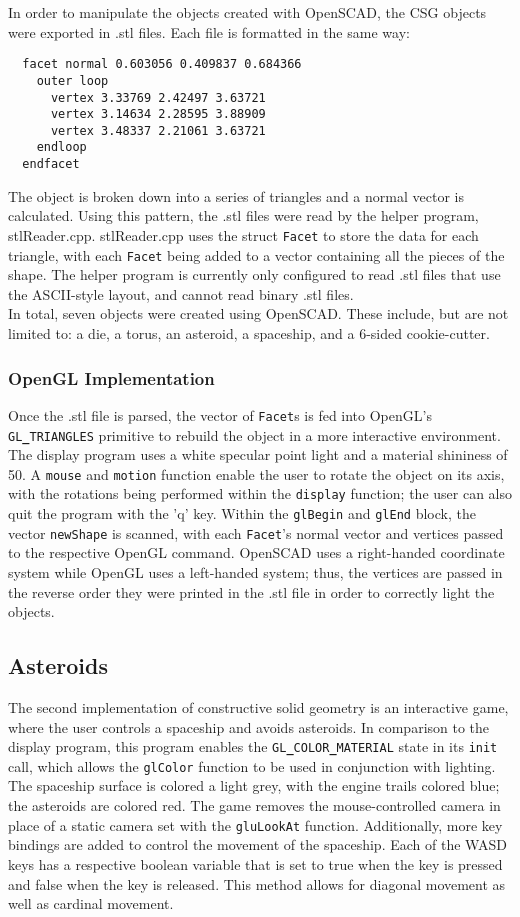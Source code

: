 \documentclass[12pt]{article}
\begin{document}
\begin{doublespace}
In order to manipulate the objects created with OpenSCAD, the CSG objects were exported in .stl files. Each file is formatted in the same way:
\begin{lstlisting}
  facet normal 0.603056 0.409837 0.684366
    outer loop
      vertex 3.33769 2.42497 3.63721
      vertex 3.14634 2.28595 3.88909
      vertex 3.48337 2.21061 3.63721
    endloop
  endfacet
\end{lstlisting}
The object is broken down into a series of triangles and a normal vector is calculated. Using this pattern, the .stl files were read by the helper program, stlReader.cpp. stlReader.cpp uses the struct \texttt{Facet} to store the data for each triangle, with each \texttt{Facet} being added to a vector containing all the pieces of the shape. The helper program is currently only configured to read .stl files that use the ASCII-style layout, and cannot read binary .stl files.\\

In total, seven objects were created using OpenSCAD. These include, but are not limited to: a die, a torus, an asteroid, a spaceship, and a 6-sided cookie-cutter.
\subsubsection{OpenGL Implementation}
Once the .stl file is parsed, the vector of \texttt{Facet}s is fed into OpenGL's \texttt{GL{\bf\_}TRIANGLES} primitive to rebuild the object in a more interactive environment. The display program uses a white specular point light and a material shininess of 50. A \texttt{mouse} and \texttt{motion} function enable the user to rotate the object on its axis, with the rotations being performed within the \texttt{display} function; the user can also quit the program with the 'q' key. Within the \texttt{glBegin} and \texttt{glEnd} block, the vector \texttt{newShape} is scanned, with each \texttt{Facet}'s normal vector and vertices passed to the respective OpenGL command. OpenSCAD uses a right-handed coordinate system while OpenGL uses a left-handed system; thus, the vertices are passed in the reverse order they were printed in the .stl file in order to correctly light the objects.
\subsection{Asteroids}
The second implementation of constructive solid geometry is an interactive game, where the user controls a spaceship and avoids asteroids. In comparison to the display program, this program enables the \texttt{GL{\bf\_}COLOR{\bf\_}MATERIAL} state in its \texttt{init} call, which allows the \texttt{glColor} function to be used in conjunction with lighting. The spaceship surface is colored a light grey, with the engine trails colored blue; the asteroids are colored red. The game removes the mouse-controlled camera in place of a static camera set with the \texttt{gluLookAt} function. Additionally, more key bindings are added to control the movement of the spaceship. Each of the WASD keys has a respective boolean variable that is set to true when the key is pressed and false when the key is released. This method allows for diagonal movement as well as cardinal movement. 

\end{doublespace}
\end{document}
